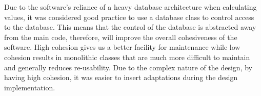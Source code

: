 
Due to the software's reliance of a heavy database architecture when calculating values, it was considered good practice to use a database class to control access to the database. This means that the control of the database is abstracted away from the main code, therefore, will improve the overall cohesiveness of the software. High cohesion gives us a better facility for maintenance while low cohesion results in monolithic classes that are  much more difficult to maintain and generally reduces re-usability. Due to the complex nature of the design, by having high cohesion, it was easier to insert adaptations during the design implementation.


